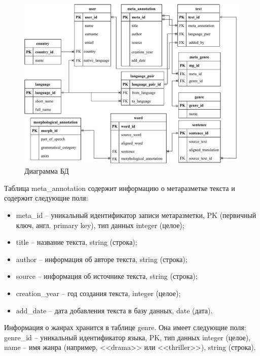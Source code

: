 \begin{figure}[ht]
	\centering
	\includegraphics[width=\textwidth]{img/er-base.pdf}
	\caption{Диаграмма БД}
	\label{er-base}
\end{figure}
\pagebreak

Таблица meta\_annotation содержит информацию о метаразметке текста и содержит следующие поля:

\begin{itemize}[label=---]
	\item meta\_id -- уникальный идентификатор записи метаразметки, PK (первичный ключ, англ. primary key), тип данных integer (целое);
	
	\item title -- название текста, string (строка);
	
	\item author -- информация об авторе текста, string (строка); 
	
	\item source -- информация об источнике текста, string (строка);
	
	\item creation\_year -- год создания текста, integer (целое);
	
	\item add\_date -- дата добавления текста в базу данных, date (дата).
\end{itemize}

Информация о жанрах хранится в таблице genre. Она имеет следующие поля: genre\_id -- уникальный идентификатор языка, PK, тип данных integer (целое), name -- имя жанра (например, <<drama>> или <<thriller>>), string (строка).


